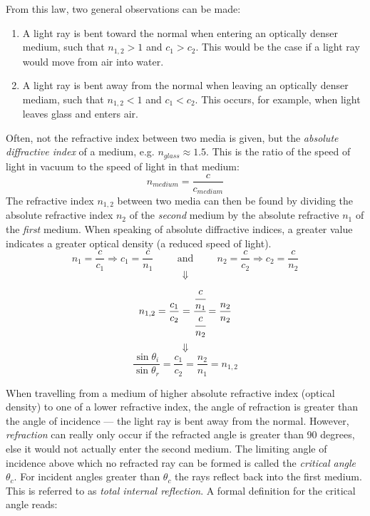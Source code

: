  From this law, two general observations can be made:

 \begin{enumerate}
 	\item A light ray is bent toward the normal when entering an optically denser medium, such that $n_{1, 2} > 1$ and $c_1 > c_2$. This would be the case if a light ray would move from air into water.

 	\item A light ray is bent away from the normal when leaving an optically denser mediam, such that $n_{1, 2} < 1$ and $c_1 < c_2$. This occurs, for example, when light leaves glass and enters air.
 \end{enumerate}

 Often, not the refractive index between two media is given, but the \emph{absolute diffractive index} of a medium, e.g. $n_{glass} \approx 1.5$. This is the ratio of the speed of light in vacuum to the speed of light in that medium: $$n_{medium} = \frac{c}{c_{medium}}$$ The refractive index $n_{1, 2}$ between two media can then be found by dividing the absolute refractive index $n_2$ of the \emph{second} medium by the absolute refractive $n_1$ of the \emph{first} medium. When speaking of absolute diffractive indices, a greater value indicates a greater optical density (a reduced speed of light). $$n_1 = \frac{c}{c_1} \Rightarrow c_1 = \frac{c}{n_1} \hspace{1cm} \text{and} \hspace{1cm} n_2 = \frac{c}{c_2} \Rightarrow c_2 = \frac{c}{n_2}$$ $$\Downarrow$$ $$n_{1, 2} = \frac{c_1}{c_2} = \cfrac{\cfrac{c}{n_1}}{\cfrac{c}{n_2}} = \frac{n_2}{n_2}$$ $$\Downarrow$$ $$\frac{\sin \theta_i}{\sin \theta_r} = \frac{c_1}{c_2} = \frac{n_2}{n_1} = n_{1, 2}$$

\pagebreak


When travelling from a medium of higher absolute refractive index (optical density) to one of a lower refractive index, the angle of refraction is greater than the angle of incidence --- the light ray is bent away from the normal. However, \emph{refraction} can really only occur if the refracted angle is greater than 90 degrees, else it would not actually enter the second medium. The limiting angle of incidence above which no refracted ray can be formed is called the \emph{critical angle} $\theta_c$. For incident angles greater than $\theta_c$ the rays reflect back into the first medium. This is referred to as \emph{total internal reflection}. A formal definition for the critical angle reads:

